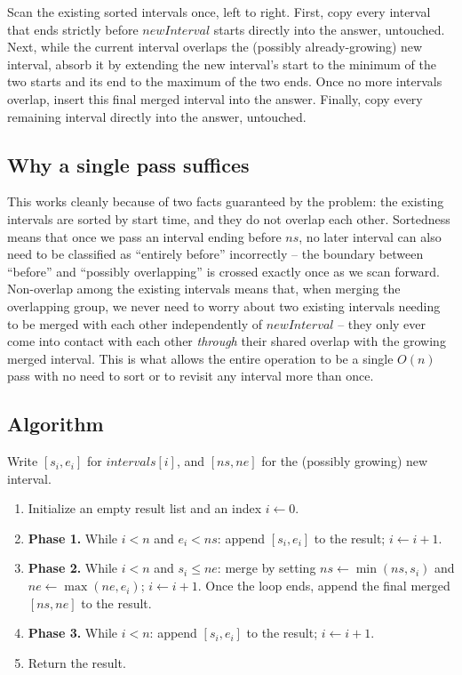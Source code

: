 \begin{ideabox}
Scan the existing sorted intervals once, left to right. First, copy every
interval that ends strictly before $\textit{newInterval}$ starts directly
into the answer, untouched. Next, while the current interval overlaps the
(possibly already-growing) new interval, absorb it by extending the new
interval's start to the minimum of the two starts and its end to the maximum
of the two ends. Once no more intervals overlap, insert this final merged
interval into the answer. Finally, copy every remaining interval directly
into the answer, untouched.
\end{ideabox}

\subsection*{Why a single pass suffices}

This works cleanly because of two facts guaranteed by the problem: the
existing intervals are sorted by start time, and they do not overlap each
other. Sortedness means that once we pass an interval ending before
$\textit{ns}$, no later interval can also need to be classified as
``entirely before'' incorrectly -- the boundary between ``before'' and
``possibly overlapping'' is crossed exactly once as we scan forward.
Non-overlap among the existing intervals means that, when merging the
overlapping group, we never need to worry about two existing intervals
needing to be merged with each other independently of
$\textit{newInterval}$ -- they only ever come into contact with each other
\emph{through} their shared overlap with the growing merged interval. This
is what allows the entire operation to be a single $O(n)$ pass with no
need to sort or to revisit any interval more than once.

\subsection*{Algorithm}

Write $[s_i, e_i]$ for $\textit{intervals}[i]$, and $[\textit{ns},
\textit{ne}]$ for the (possibly growing) new interval.

\begin{enumerate}
  \item Initialize an empty result list and an index $i \gets 0$.
  \item \textbf{Phase 1.} While $i < n$ and $e_i < \textit{ns}$: append
        $[s_i, e_i]$ to the result; $i \gets i+1$.
  \item \textbf{Phase 2.} While $i < n$ and $s_i \le \textit{ne}$: merge by
        setting $\textit{ns} \gets \min(\textit{ns}, s_i)$ and
        $\textit{ne} \gets \max(\textit{ne}, e_i)$; $i \gets i+1$. Once the
        loop ends, append the final merged $[\textit{ns}, \textit{ne}]$ to
        the result.
  \item \textbf{Phase 3.} While $i < n$: append $[s_i, e_i]$ to the result;
        $i \gets i+1$.
  \item Return the result.
\end{enumerate}

